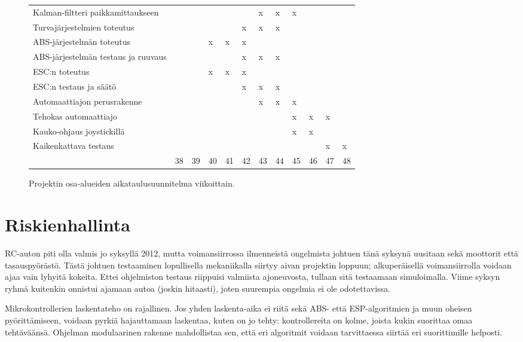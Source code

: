 \documentclass{article}
\begin{document}
\begin{figure}[H]
\begin{tabular}{l|l|l|l|l|l|l|l|l|l|l|l|}
		Kalman-filtteri paikkamittaukseen
		&   &   &   &   &   & x & x & x &   &   &   \\
		Turvajärjestelmien toteutus 
		&   &   &   &   & x & x & x &   &   &   &   \\
		ABS-järjestelmän toteutus
		&   &   & x & x & x &   &   &   &   &   &   \\
		ABS-järjestelmän testaus ja ruuvaus
		&   &   &   &   & x & x & x &   &   &   &   \\
		ESC:n toteutus
		&   &   & x & x & x &   &   &   &   &   &   \\
		ESC:n testaus ja säätö
		&   &   &   &   & x & x & x &   &   &   &   \\
		Automaattiajon perusrakenne
		&   &   &   &   &   & x & x & x &   &   &   \\
		Tehokas automaattiajo
		&   &   &   &   &   &   &   & x & x & x &   \\
		Kauko-ohjaus joystickillä
		&   &   &   &   &   &   &   & x & x &   &   \\
		Kaikenkattava testaus
		&   &   &   &   &   &   &   &   &   & x & x  \\

		\hline
		& 38 & 39 & 40 & 41 & 42 & 43 & 44 & 45 & 46 & 47 & 48
	\end{tabular}
	\label{fig:aikataulu}
	\caption{Projektin osa-alueiden aikataulusuunnitelma viikoittain.}
\end{figure}

\section{Riskienhallinta}

RC-auton piti olla valmis jo syksyllä 2012, mutta voimansiirrossa ilmenneistä ongelmista johtuen tänä syksynä uusitaan sekä moottorit että tasauspyörästö. Tästä johtuen testaaminen lopullisella mekaniikalla siirtyy aivan projektin loppuun; alkuperäisellä voimansiirrolla voidaan ajaa vain lyhyitä kokeita. Ettei ohjelmiston testaus riippuisi valmiista ajoneuvosta, tullaan sitä testaamaan simuloimalla. Viime syksyn ryhmä kuitenkin onnistui ajamaan autoa (joskin hitaasti), joten suurempia ongelmia ei ole odotettavissa.

Mikrokontrollerien laskentateho on rajallinen. Jos yhden laskenta-aika ei riitä sekä ABS- että ESP-algoritmien ja muun oheisen pyörittämiseen, voidaan pyrkiä hajauttamaan laskentaa, kuten on jo tehty: kontrollereita on kolme, joista kukin suorittaa omaa tehtäväänsä. Ohjelman modulaarinen rakenne mahdollistaa sen, että eri algoritmit voidaan tarvittaessa siirtää eri suorittimille helposti.
\end{document}
